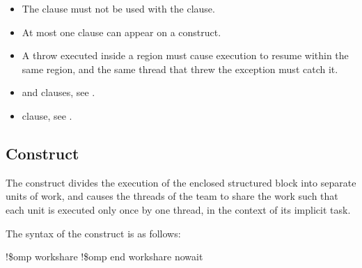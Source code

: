 \begin{itemize}
\item The  clause must not be used with the  clause.

\item At most one  clause can appear on a  construct.

\cppspecificstart
\item A throw executed inside a  region must cause execution to resume within the 
same  region, and the same thread that threw the exception must catch it.
\cppspecificend
\end{itemize}


\crossreferences
\begin{itemize}
\item {} and  clauses, see 
.

\item {} clause, see 
.
\end{itemize}













\begin{samepage}
\vspace{3\baselineskip}
\fortranspecificstart
\vspace{-3\baselineskip}
\subsection{ Construct}
\label{subsec:workshare Construct}
\summary
The  construct divides the execution of the enclosed structured block into 
separate units of work, and causes the threads of the team to share the work such that 
each unit is executed only once by one thread, in the context of its implicit task.
\end{samepage}

\begin{samepage}
\syntax
The syntax of the  construct is as follows:

\begin{boxedcode}
!\$omp workshare
!\$omp end workshare \plc{[}nowait\plc{]}
\end{boxedcode}
\end{samepage}

